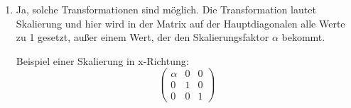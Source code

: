 \documentclass[11pt]{article}
\begin{document}
\begin{enumerate}
        Um zu erreichen, dass das Ergebnis $\begin{pmatrix} 0 \\ 5 \\ 0 \end{pmatrix}$ ist, muss gelten: $5a=0$, $5b=5$, und $5c=0$. Daraus folgt $a=0$, $b=1$, $c=0$. Die Matrix muss eine Drehung sein, die den Vektor $(5, 0, 0)^T$ (der auf der x-Achse liegt) auf den Vektor $(0, 5, 0)^T$ (der auf der y-Achse liegt) abbildet. Dies ist eine Rotation um die z-Achse um $90^\circ$.

        Die Rotationsmatrix lautet:

        \[
          \begin{pmatrix}
            \cos(90\text{°}) & -\sin(90\text{°}) & 0 \\
            \sin(90\text{°}) & \cos(90\text{°})  & 0 \\
            0                & 0                 & 1
          \end{pmatrix}
          =
          \begin{pmatrix}
            0 & -1 & 0 \\
            1 & 0  & 0 \\
            0 & 0  & 1
          \end{pmatrix}
        \]

  \item Ja, solche Transformationen sind möglich. Die Transformation lautet Skalierung und hier wird in der Matrix auf der Hauptdiagonalen alle Werte zu 1 gesetzt, außer einem Wert, der den Skalierungsfaktor $\alpha$ bekommt.

        Beispiel einer Skalierung in x-Richtung:
        \[
          \begin{pmatrix}
            \alpha & 0 & 0 \\
            0      & 1 & 0 \\
            0      & 0 & 1
          \end{pmatrix}
        \]


\end{enumerate}
\end{document}
